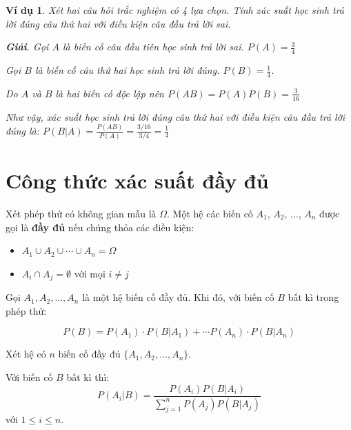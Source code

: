 \documentclass{mynotes}
\newtheorem{example}{Ví dụ}
\begin{document}
\begin{example}
    Xét hai câu hỏi trắc nghiệm có 4 lựa chọn. Tính xác suất học sinh trả lời đúng câu thứ hai với điều kiện câu đầu trả lời sai.
    
    \textbf{Giải}. Gọi $A$ là biến cố câu đầu tiên học sinh trả lời sai. $P(A) = \frac{3}{4}$
    
    Gọi $B$ là biến cố câu thứ hai học sinh trả lời đúng. $P(B) = \frac{1}{4}$.
    
    Do $A$ và $B$ là hai biến cố độc lập nên $P(AB) = P(A) P(B) = \frac{3}{16}$
    
    Như vậy, xác suất học sinh trả lời đúng câu thứ hai với điều kiện câu đầu trả lời đúng là: $P(B | A) = \frac{P(AB)}{P(A)} = \frac{3 / 16}{3 / 4} = \frac{1}{4}$
\end{example}

\section{Công thức xác suất đầy đủ}

\begin{definition}
    Xét phép thử có không gian mẫu là $\Omega$. Một hệ các biến cố $A_1$, $A_2$, ..., $A_n$ được gọi là \textbf{đầy đủ} nếu chúng thỏa các điều kiện:
    \begin{itemize}
        \item $A_1 \cup A_2 \cup \cdots \cup A_n = \Omega$
        \item $A_i \cap A_j = \emptyset$ với mọi $i \neq j$
    \end{itemize}
\end{definition}
    
\begin{theorem}
    Gọi $A_1, A_2, \ldots, A_n$ là một hệ biến cố đầy đủ. Khi đó, với biến cố $B$ bất kì trong phép thử: 
    
    \begin{equation}    
        P(B) = P(A_1) \cdot P(B | A_1) + \cdots P(A_n) \cdot P(B | A_n)
    \end{equation}
\end{theorem}

\begin{theorem}
    Xét hệ có $n$ biến cố đầy đủ $\{ A_1, A_2, \ldots, A_n \}$. 
    
    Với biến cố $B$ bất kì thì: \[P(A_i | B) = \frac{P(A_i) P(B | A_i)}{\displaystyle{\sum_{j=1}^n P(A_j) P(B | A_j)}}\] với $1 \leq i \leq n$.
\end{theorem}
\end{document}
